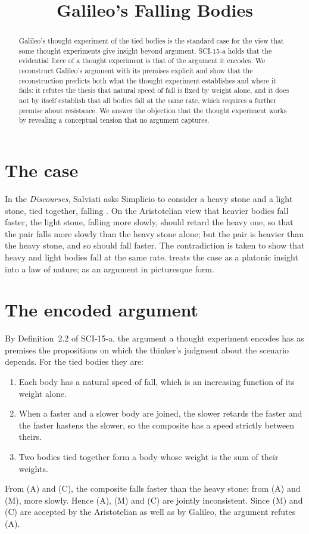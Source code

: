 \documentclass{situationist-preprint}
\title{Galileo's Falling Bodies}
\begin{document}
\maketitle

\begin{abstract}
Galileo's thought experiment of the tied bodies is the standard case for the view that some thought experiments give insight beyond argument. SCI-15-a holds that the evidential force of a thought experiment is that of the argument it encodes. We reconstruct Galileo's argument with its premises explicit and show that the reconstruction predicts both what the thought experiment establishes and where it fails: it refutes the thesis that natural speed of fall is fixed by weight alone, and it does not by itself establish that all bodies fall at the same rate, which requires a further premise about resistance. We answer the objection that the thought experiment works by revealing a conceptual tension that no argument captures.
\end{abstract}

\section{The case}

In the \emph{Discourses}, Salviati asks Simplicio to consider a heavy stone and a light stone, tied together, falling \citep{Galileo1638}. On the Aristotelian view that heavier bodies fall faster, the light stone, falling more slowly, should retard the heavy one, so that the pair falls more slowly than the heavy stone alone; but the pair is heavier than the heavy stone, and so should fall faster. The contradiction is taken to show that heavy and light bodies fall at the same rate. \citet{Brown1991} treats the case as a platonic insight into a law of nature; \citet{Norton1996} as an argument in picturesque form.

\section{The encoded argument}

By Definition~2.2 of SCI-15-a, the argument a thought experiment encodes has as premises the propositions on which the thinker's judgment about the scenario depends. For the tied bodies they are:
\begin{enumerate}
\item[(A)] Each body has a natural speed of fall, which is an increasing function of its weight alone.
\item[(M)] When a faster and a slower body are joined, the slower retards the faster and the faster hastens the slower, so the composite has a speed strictly between theirs.
\item[(C)] Two bodies tied together form a body whose weight is the sum of their weights.
\end{enumerate}
From (A) and (C), the composite falls faster than the heavy stone; from (A) and (M), more slowly. Hence (A), (M) and (C) are jointly inconsistent. Since (M) and (C) are accepted by the Aristotelian as well as by Galileo, the argument refutes (A).
\end{document}
